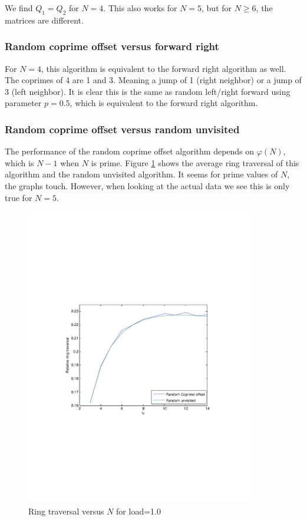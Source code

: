 \documentclass[10pt,a4paper]{article}
\begin{document}
We find $Q_1 = Q_2$ for $N=4$. This also works for $N=5$, but for $N \geq 6$, the matrices are different.

\subsubsection*{Random coprime offset versus forward right}
For $N=4$, this algorithm is equivalent to the forward right algorithm as well. The coprimes of 4 are 1 and 3. Meaning a jump of 1 (right neighbor) or a jump of 3 (left neighbor). It is clear this is the same as random left/right forward using parameter $p=0.5$, which is equivalent to the forward right algorithm.

\subsubsection*{Random coprime offset versus random unvisited}
The performance of the random coprime offset algorithm depends on $\varphi(N)$, which is $N-1$ when $N$ is prime. Figure \ref{figrcovsru} shows the average ring traversal of this algorithm and the random unvisited algorithm. It seems for prime values of $N$, the graphs touch. However, when looking at the actual data we see this is only true for $N=5$.

\begin{figure}[h!tb]
\centering
\includegraphics[clip=true, trim=9em 24em 9em 24em, width=0.9\textwidth]{resources/plotload10rurpo.pdf}
\caption{Ring traversal versus $N$ for load=1.0}
\label{figrcovsru}
\end{figure}
\end{document}
